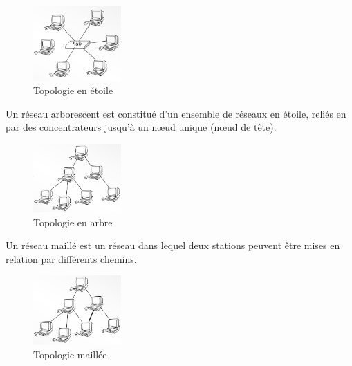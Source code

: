 \documentclass[a4paper, 9pt]{article}
\begin{document}
            \begin{figure}[ht]
                \centering
                \includegraphics[width=0.3\textwidth]{topologie_etoile.png}
                \caption{Topologie en étoile}
                \label{fig:topologie_etoile}
            \end{figure}
            \begin{description}[style=nextline]
                \item[topologie en arbre:]
                Un réseau arborescent est constitué d’un ensemble de réseaux en étoile,
                reliés en par des concentrateurs jusqu’à un nœud unique (nœud de tête).
            \end{description}
            \begin{figure}[ht]
                \centering
                \includegraphics[width=0.3\textwidth]{topologie_arbre.png}
                \caption{Topologie en arbre}
                \label{fig:topologie_arbre}
            \end{figure}
            \begin{description}[style=nextline]
                \item[topologie maillée:]
                Un réseau maillé est un réseau dans lequel deux stations peuvent être mises en
                relation par différents chemins.
            \end{description}
            \begin{figure}[ht]
                \centering
                \includegraphics[width=0.3\textwidth]{topologie_maillee.png}
                \caption{Topologie maillée}
                \label{fig:topologie_maillee}
            \end{figure}
\end{document}
